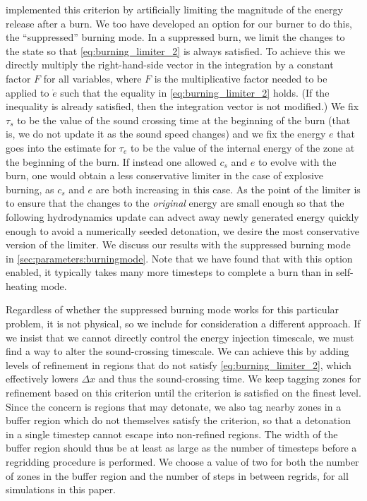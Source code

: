 \documentclass[twocolumn,numberedappendix]{../aastex6}
\begin{document}
\citet{kushnir:2013} implemented this criterion by artificially 
limiting the magnitude of the energy release after a burn. We
too have developed an option for our burner to do this,
the ``suppressed'' burning mode. In a suppressed burn, we limit
the changes to the state so that \autoref{eq:burning_limiter_2}
is always satisfied. To achieve this we directly multiply the
right-hand-side vector in the integration by a constant factor $F$
for all variables, where $F$ is the multiplicative factor needed to
be applied to $\dot{e}$ such that the equality in \autoref{eq:burning_limiter_2}
holds. (If the inequality is already satisfied, then the integration
vector is not modified.) We fix $\tau_s$ to be the value of the sound
crossing time at the beginning of the burn (that is, we do not
update it as the sound speed changes) and we fix the energy $e$
that goes into the estimate for $\tau_e$ to be the value of the
internal energy of the zone at the beginning of the burn. If
instead one allowed $c_s$ and $e$ to evolve with the burn, one
would obtain a less conservative limiter in the case of explosive
burning, as $c_s$ and $e$ are both increasing in this case.
As the point of the limiter is to ensure that the changes to the
\textit{original} energy are small enough so that the following
hydrodynamics update can advect away newly generated energy
quickly enough to avoid a numerically seeded detonation,
we desire the most conservative version of the limiter. We discuss
our results with the suppressed burning mode in \autoref{sec:parameters:burningmode}.
Note that we have found that with this option enabled, it typically takes
many more timesteps to complete a burn than in self-heating mode.

Regardless of whether the suppressed burning mode works for this
particular problem, it is not physical, so we include for
consideration a different approach. If we insist that we
cannot directly control the energy injection timescale, we 
must find a way to alter the sound-crossing timescale. 
We can achieve this by adding levels of refinement in 
regions that do not satisfy \autoref{eq:burning_limiter_2},
which effectively lowers $\Delta x$ and thus the
sound-crossing time. We keep tagging zones for refinement
based on this criterion until the criterion is satisfied
on the finest level. Since the concern is regions that 
may detonate, we also tag nearby zones in a buffer region
which do not themselves satisfy the criterion,
so that a detonation in a single timestep cannot 
escape into non-refined regions. The width of the buffer 
region should thus be at least as large as the number of 
timesteps before a regridding procedure is performed.
We choose a value of two for both the number of zones in the 
buffer region and the number of steps in between regrids,
for all simulations in this paper.
\end{document}
